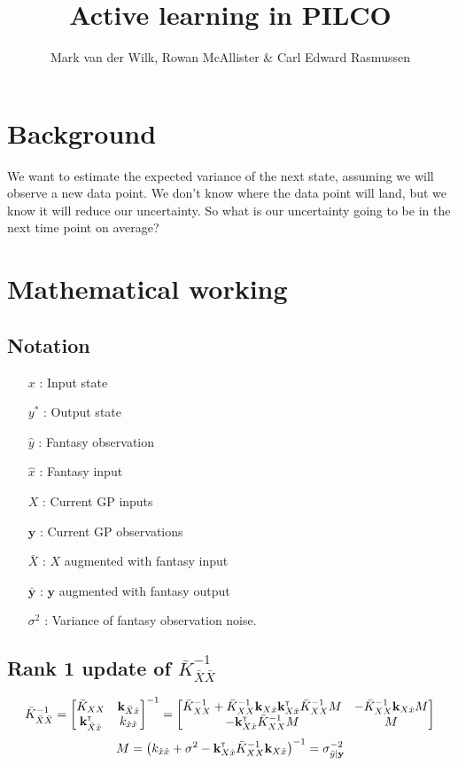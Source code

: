 \documentclass[a4paper,12pt]{article}
\newcommand{\transpose}{^\mathrm{\textsf{\tiny T}}}
\newcommand{\inv}{^{-1}}
\newcommand{\vk}{\mathbf{k}}
\newcommand{\vy}{\mathbf{y}}
\newcommand{\is}{x}                      %
\newcommand{\os}{y^*}                    %
\newcommand{\fo}{\hat{y}}                %
\newcommand{\fostd}{\sigma_{\fo|\vy}}
\newcommand{\foprec}{\fostd^{-2}}
\newcommand{\fin}{\hat{x}}               %
\newcommand{\Xaug}{\bar{X}}
\newcommand{\yaug}{\bar{\vy}}
\newcommand{\K}{\bar{K}_{XX}}
\newcommand{\Kaug}{\bar{K}_{\Xaug\Xaug}}
\newcommand{\Kaugfin}{\vk_{\Xaug \fin}}
\begin{document}
\title{Active learning in PILCO}
\author{Mark van der Wilk, Rowan McAllister \& Carl Edward Rasmussen}
\maketitle

\section{Background}
We want to estimate the expected variance of the next state, assuming we will observe a new data point. We don't know where the data point will land, but we know it will reduce our uncertainty. So what is our uncertainty going to be in the next time point on average?

\section{Mathematical working}
\subsection{Notation}
\begin{itemize}[noitemsep,topsep=0pt,parsep=0pt,partopsep=0pt,labelwidth=1cm,align=left,itemindent=1cm]
  \item[$\is$]:  Input state
  \item[$\os$]:  Output state
  \item[$\fo$]:  Fantasy observation
  \item[$\fin$]:  Fantasy input
  \item[$X$]:  Current GP inputs
  \item[$\vy$]:  Current GP observations
  \item[$\Xaug$]: $X$ augmented with fantasy input
  \item[$\yaug$]: $\vy$ augmented with fantasy output
  \item[$\sigma^2$]:  Variance of fantasy observation noise.
\end{itemize}


\subsection{Rank 1 update of $\Kaug\inv$}
\begin{align}
\Kaug\inv = \begin{bmatrix} \K & \Kaugfin \\ \Kaugfin\transpose & k_{\fin\fin} \end{bmatrix}\inv = \begin{bmatrix} \K\inv + \K\inv\vk_{X\fin}\vk_{X\fin}\transpose\K\inv M & -\K\inv\vk_{X\fin} M \\ -\vk_{X\fin}\transpose\K\inv M & M \end{bmatrix}
\end{align}
\begin{align}
M = \left( k_{\fin\fin} + \sigma^2 - \vk_{X\fin}\transpose\K\inv\vk_{X\fin}\right)\inv = \foprec
\end{align}
\end{document}
